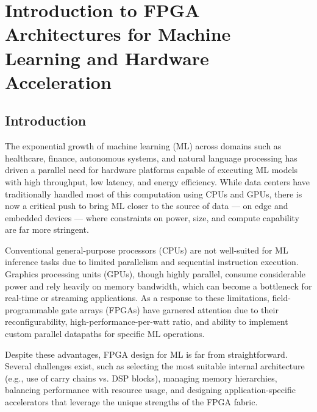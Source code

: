 \chapter{Introduction to FPGA Architectures for Machine Learning and Hardware Acceleration}

\section[Introduction]{\textbf{Introduction}}
The exponential growth of machine learning (ML) across domains such as healthcare, finance, autonomous systems, and natural language processing has driven a parallel need for hardware platforms capable of executing ML models with high throughput, low latency, and energy efficiency. While data centers have traditionally handled most of this computation using CPUs and GPUs, there is now a critical push to bring ML closer to the source of data — on edge and embedded devices — where constraints on power, size, and compute capability are far more stringent.

Conventional general-purpose processors (CPUs) are not well-suited for ML inference tasks due to limited parallelism and sequential instruction execution. Graphics processing units (GPUs), though highly parallel, consume considerable power and rely heavily on memory bandwidth, which can become a bottleneck for real-time or streaming applications. As a response to these limitations, field-programmable gate arrays (FPGAs) have garnered attention due to their reconfigurability, high-performance-per-watt ratio, and ability to implement custom parallel datapaths for specific ML operations.

Despite these advantages, FPGA design for ML is far from straightforward. Several challenges exist, such as selecting the most suitable internal architecture (e.g., use of carry chains vs. DSP blocks), managing memory hierarchies, balancing performance with resource usage, and designing application-specific accelerators that leverage the unique strengths of the FPGA fabric.

